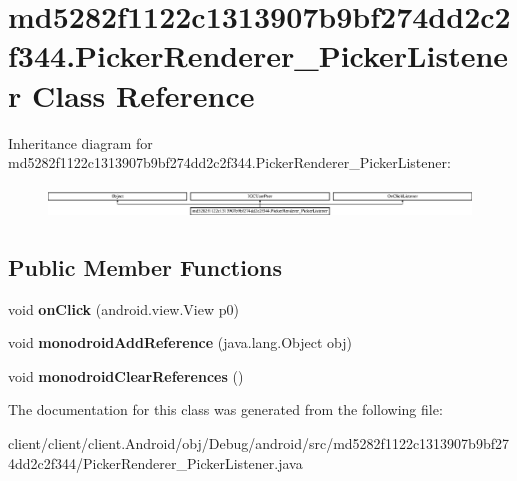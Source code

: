 \hypertarget{classmd5282f1122c1313907b9bf274dd2c2f344_1_1PickerRenderer__PickerListener}{}\section{md5282f1122c1313907b9bf274dd2c2f344.\+Picker\+Renderer\+\_\+\+Picker\+Listener Class Reference}
\label{classmd5282f1122c1313907b9bf274dd2c2f344_1_1PickerRenderer__PickerListener}
Inheritance diagram for md5282f1122c1313907b9bf274dd2c2f344.\+Picker\+Renderer\+\_\+\+Picker\+Listener\+:\begin{figure}[H]
\begin{center}
\leavevmode
\includegraphics[height=0.850418cm]{classmd5282f1122c1313907b9bf274dd2c2f344_1_1PickerRenderer__PickerListener}
\end{center}
\end{figure}
\subsection*{Public Member Functions}
\begin{DoxyCompactItemize}
\item 
\hypertarget{classmd5282f1122c1313907b9bf274dd2c2f344_1_1PickerRenderer__PickerListener_af31d8761e812b571b48a4415c1d1c54c}{}void {\bfseries on\+Click} (android.\+view.\+View p0)\label{classmd5282f1122c1313907b9bf274dd2c2f344_1_1PickerRenderer__PickerListener_af31d8761e812b571b48a4415c1d1c54c}

\item 
\hypertarget{classmd5282f1122c1313907b9bf274dd2c2f344_1_1PickerRenderer__PickerListener_a8b28668bdbe07ebc8a450d2972505fed}{}void {\bfseries monodroid\+Add\+Reference} (java.\+lang.\+Object obj)\label{classmd5282f1122c1313907b9bf274dd2c2f344_1_1PickerRenderer__PickerListener_a8b28668bdbe07ebc8a450d2972505fed}

\item 
\hypertarget{classmd5282f1122c1313907b9bf274dd2c2f344_1_1PickerRenderer__PickerListener_a4fadcb8393e217cecd0a5dad4588973b}{}void {\bfseries monodroid\+Clear\+References} ()\label{classmd5282f1122c1313907b9bf274dd2c2f344_1_1PickerRenderer__PickerListener_a4fadcb8393e217cecd0a5dad4588973b}

\end{DoxyCompactItemize}


The documentation for this class was generated from the following file\+:\begin{DoxyCompactItemize}
\item 
client/client/client.\+Android/obj/\+Debug/android/src/md5282f1122c1313907b9bf274dd2c2f344/Picker\+Renderer\+\_\+\+Picker\+Listener.\+java\end{DoxyCompactItemize}
